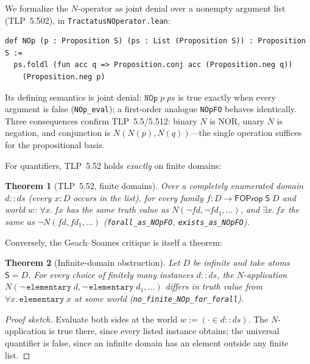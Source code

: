 \documentclass[jsl,bibother]{asl}
\newtheorem{theorem}{Theorem}[section]
\theoremstyle{definition}
\theoremstyle{remark}
\newcommand{\Sach}{\mathsf{S}}
\begin{document}
We formalize the $N$-operator as joint denial over a nonempty
argument list (TLP~5.502), in
\texttt{Tractatus\allowbreak{}NOperator\allowbreak{}.lean}:

\begin{lstlisting}
def NOp (p : Proposition S) (ps : List (Proposition S)) : Proposition S :=
  ps.foldl (fun acc q => Proposition.conj acc (Proposition.neg q))
    (Proposition.neg p)
\end{lstlisting}

\noindent
Its defining semantics is joint denial: $\mathtt{NOp}\;p\;ps$ is
true exactly when every argument is false (\texttt{NOp\_eval});
a first-order analogue \texttt{NOpFO} behaves identically.
Three consequences confirm TLP~5.5/5.512: binary $N$ is NOR,
unary $N$ is negation, and conjunction is $N(N(p), N(q))$---the
single operation suffices for the propositional basis.

For quantifiers, TLP~5.52 holds \emph{exactly} on finite
domains:

\begin{theorem}[TLP~5.52, finite domains]
\label{thm:tlp552}
Over a completely enumerated domain $d :: ds$ (every $x : D$
occurs in the list), for every family
$f : D \to \mathsf{FOProp}\;\Sach\;D$ and world $w$:
$\forall x.\,f x$ has the same truth value as
$N(\lnot f d, \lnot f d_1, \ldots)$, and $\exists x.\,f x$ the
same as $\lnot N(f d, f d_1, \ldots)$
(\texttt{forall\_as\_NOpFO}, \texttt{exists\_as\_NOpFO}).
\end{theorem}

\noindent
Conversely, the Geach--Soames critique is itself a theorem:

\begin{theorem}[Infinite-domain obstruction]
\label{thm:geach-soames}
Let $D$ be infinite and take atoms $\Sach = D$.  For every
choice of finitely many instances $d :: ds$, the $N$-application
$N(\lnot\,\mathtt{elementary}\;d, \lnot\,\mathtt{elementary}\;d_1,
\ldots)$ differs in truth value from
$\forall x.\,\mathtt{elementary}\;x$ at some world
(\texttt{no\_finite\_NOp\_for\_forall}).
\end{theorem}

\begin{proof}[Proof sketch]
Evaluate both sides at the world $w := (\cdot \in d :: ds)$.
The $N$-application is true there, since every listed instance
obtains; the universal quantifier is false, since an infinite
domain has an element outside any finite list.
\end{proof}
\end{document}
